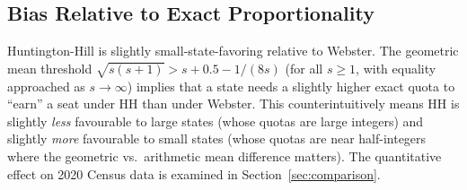 \subsection{Bias Relative to Exact Proportionality}

Huntington-Hill is slightly small-state-favoring relative to Webster.
The geometric mean threshold $\sqrt{s(s+1)} > s + 0.5 - 1/(8s)$
(for all $s \geq 1$, with equality approached as $s\to\infty$)
implies that a state needs a slightly higher exact quota to ``earn''
a seat under HH than under Webster.
This counterintuitively means HH is slightly \emph{less}
favourable to large states (whose quotas are large integers) and
slightly \emph{more} favourable to small states (whose quotas are near
half-integers where the geometric vs.\ arithmetic mean difference matters).
The quantitative effect on 2020 Census data is examined in
Section~\ref{sec:comparison}.
